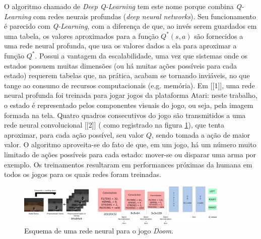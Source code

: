 \documentclass[cic,tc]{iiufrgs}
\begin{document}
O algoritmo chamado de \textit{Deep Q-Learning} tem este nome porque combina
\textit{Q-Learning} com redes neurais profundas (\textit{deep neural networks}).
Seu funcionamento é parecido com \textit{Q-Learning}, com a diferença de que, ao
invés serem guardados em uma tabela, os valores aproximados para a função
$Q^*(s, a)$ são fornecidos a uma rede neural profunda, que usa os valores
dados a ela para aproximar a função $Q^*$. Possui a vantagem da escalabilidade,
uma vez que sistemas onde os estados possuem muitas dimensões (ou há muitas
ações possíveis para cada estado) requerem tabelas que, na prática, acabam se
tornando inviáveis, no que tange ao consumo de recursos computacionais (e.g.
memória). Em [[1]], uma rede neural profunda foi treinada para jogar jogos da
plataforma Atari: neste trabalho, o estado é representado pelos componentes
visuais do jogo, ou seja, pela imagem formada na tela. Quatro quadros
consecutivos do jogo são transmitidos a uma rede neural convolucional [[2]] (
como registrado na figura \ref{fig:doom_neural_network}), que
tenta aproximar, para cada ação possível, seu valor $Q$, sendo tomada a ação de
maior valor. O algoritmo aproveita-se do fato de que, em um jogo, há um número
muito limitado de ações possíveis para cada estado: mover-se ou disparar uma
arma por exemplo. Os treinamentos resultaram em performances próximas da humana
em todos os jogos para os quais redes foram treinadas.

\begin{figure}[h]
    \caption{Esquema de uma rede neural para o jogo \textit{Doom}.}
    \begin{center}
      \includegraphics[width=0.9\textwidth]{cnn_doom.png}
    \end{center}
    \label{fig:doom_neural_network}
\end{figure}
\end{document}
